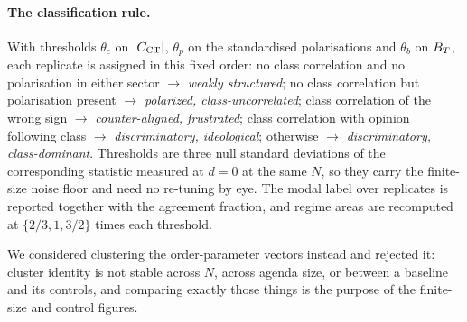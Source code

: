\paragraph{The classification rule.} With thresholds $\theta_c$ on $|C_{\mathrm{CT}}|$,
$\theta_p$ on the standardised polarisations and $\theta_b$ on $B_{T}$, each
replicate is assigned in this fixed order: no class correlation and no
polarisation in either sector $\to$ \emph{weakly structured}; no class
correlation but polarisation present $\to$ \emph{polarized, class-uncorrelated};
class correlation of the wrong sign $\to$ \emph{counter-aligned, frustrated};
class correlation with opinion following class $\to$ \emph{discriminatory,
ideological}; otherwise $\to$ \emph{discriminatory, class-dominant}. Thresholds
are three null standard deviations of the corresponding statistic measured at
$d=0$ at the same $N$, so they carry the finite-size noise floor and need no
re-tuning by eye. The modal label over replicates is reported together with the
agreement fraction, and regime areas are recomputed at $\{2/3,1,3/2\}$ times each
threshold.

We considered clustering the order-parameter vectors instead and rejected it:
cluster identity is not stable across $N$, across agenda size, or between a
baseline and its controls, and comparing exactly those things is the purpose of
the finite-size and control figures.
